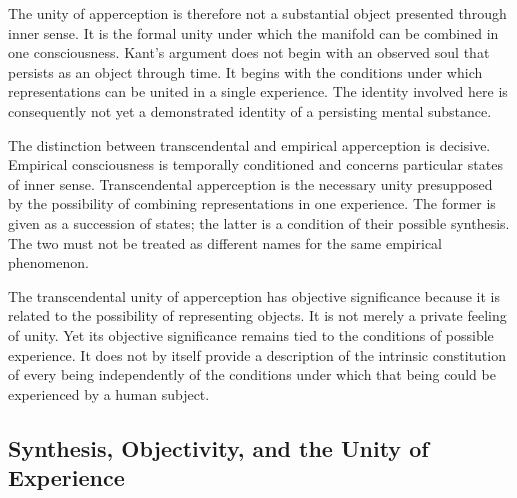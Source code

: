\label{para:VS.B01.P01.C08.S10.SS05.P003}

The unity of apperception is therefore not a
substantial object presented through inner sense.
It is the formal unity under which the manifold
can be combined in one consciousness. Kant's
argument does not begin with an observed soul
that persists as an object through time. It begins
with the conditions under which representations
can be united in a single experience. The identity
involved here is consequently not yet a demonstrated
identity of a persisting mental substance.

\label{para:VS.B01.P01.C08.S10.SS05.P004}

The distinction between transcendental and empirical
apperception is decisive. Empirical consciousness
is temporally conditioned and concerns particular
states of inner sense. Transcendental apperception
is the necessary unity presupposed by the possibility
of combining representations in one experience.
The former is given as a succession of states;
the latter is a condition of their possible synthesis.
The two must not be treated as different names
for the same empirical phenomenon.

\label{para:VS.B01.P01.C08.S10.SS05.P005}

The transcendental unity of apperception has
objective significance because it is related to
the possibility of representing objects. It is
not merely a private feeling of unity. Yet its
objective significance remains tied to the
conditions of possible experience. It does not
by itself provide a description of the intrinsic
constitution of every being independently of
the conditions under which that being could
be experienced by a human subject.



\subsection{Synthesis, Objectivity, and the Unity of Experience}
\label{subsec:ch08-kant-synthesis}

\label{para:VS.B01.P01.C08.S10.SS06.P001}

